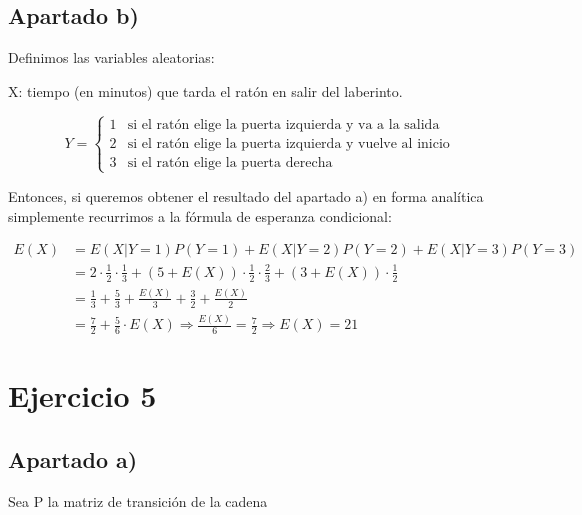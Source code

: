\documentclass[11pt]{article}
\begin{document}
\subsection*{Apartado b)}

Definimos las variables aleatorias: \\
\begin{center}
  X: tiempo (en minutos) que tarda el ratón en salir del laberinto.
\end{center}

\[
  Y = \begin{cases}
        1 & \text{si el ratón elige la puerta izquierda y va a la salida} \\
        2 & \text{si el ratón elige la puerta izquierda y vuelve al inicio} \\
        3 & \text{si el ratón elige la puerta derecha}
      \end{cases}
\]

Entonces, si queremos obtener el resultado del apartado a) en forma analítica simplemente recurrimos
a la fórmula de esperanza condicional:

\begin{align*}
  E(X) &= E(X \vert Y = 1)P(Y = 1) + E(X \vert Y = 2)P(Y = 2) + E(X \vert Y = 3)P(Y = 3) \\
       &= 2 \cdot \frac{1}{2} \cdot \frac{1}{3} + 
          (5 + E(X)) \cdot \frac{1}{2} \cdot \frac{2}{3} +
          (3 + E(X)) \cdot \frac{1}{2} \\
      &= \frac{1}{3} + \frac{5}{3} + \frac{E(X)}{3} + \frac{3}{2} + \frac{E(X)}{2} \\
      &= \frac{7}{2} + \frac{5}{6} \cdot E(X) \Rightarrow \frac{E(X)}{6} = \frac{7}{2} \Rightarrow E(X) = 21
\end{align*}


\section{Ejercicio 5}

\subsection*{Apartado a)}

Sea P la matriz de transición de la cadena
\end{document}
